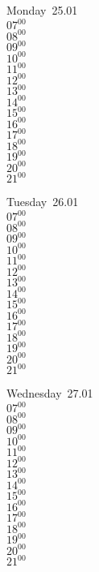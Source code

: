 \documentclass[11pt,a4paper]{book}\usepackage[]{graphicx}\usepackage[]{color}
\begin{document}
\begin{headerbox}
\end{headerbox}
\begin{weekdaybox}
  Monday~25.01\\
  { 
  \vfill
  $07^{00}$\\
$08^{00}$\\
$09^{00}$\\
$10^{00}$\\
$11^{00}$\\
$12^{00}$\\
$13^{00}$\\
$14^{00}$\\
$15^{00}$\\
$16^{00}$\\
$17^{00}$\\
$18^{00}$\\
$19^{00}$\\
$20^{00}$\\
$21^{00}$\\
  }
\end{weekdaybox}
\begin{weekdaybox}
  Tuesday~26.01\\
  { 
  \vfill
  $07^{00}$\\
$08^{00}$\\
$09^{00}$\\
$10^{00}$\\
$11^{00}$\\
$12^{00}$\\
$13^{00}$\\
$14^{00}$\\
$15^{00}$\\
$16^{00}$\\
$17^{00}$\\
$18^{00}$\\
$19^{00}$\\
$20^{00}$\\
$21^{00}$\\
  }
\end{weekdaybox}
\begin{weekdaybox}
  Wednesday~27.01\\
  { 
  \vfill
  $07^{00}$\\
$08^{00}$\\
$09^{00}$\\
$10^{00}$\\
$11^{00}$\\
$12^{00}$\\
$13^{00}$\\
$14^{00}$\\
$15^{00}$\\
$16^{00}$\\
$17^{00}$\\
$18^{00}$\\
$19^{00}$\\
$20^{00}$\\
$21^{00}$\\
  }
\end{weekdaybox}
\end{document}
